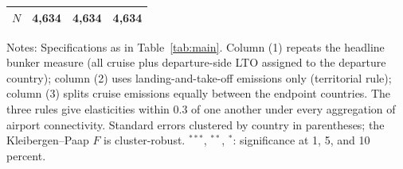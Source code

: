 \documentclass[12pt]{extarticle}
\begin{document}
\begin{table}[H]
{\begin{threeparttable}
\begin{tabular}{lccc}
  $N$ & 4,634 & 4,634 & 4,634 \\
\bottomrule
\end{tabular}
\begin{tablenotes}[flushleft]
\footnotesize
\item Notes: Specifications as in Table~\ref{tab:main}. Column (1) repeats the headline bunker measure (all cruise plus departure-side LTO assigned to the departure country); column (2) uses landing-and-take-off emissions only (territorial rule); column (3) splits cruise emissions equally between the endpoint countries. The three rules give elasticities within 0.3 of one another under every aggregation of airport connectivity. Standard errors clustered by country in parentheses; the Kleibergen--Paap $F$ is cluster-robust. $^{***}$, $^{**}$, $^{*}$: significance at 1, 5, and 10 percent.
\end{tablenotes}
\end{threeparttable}}
\end{table}
\end{document}
